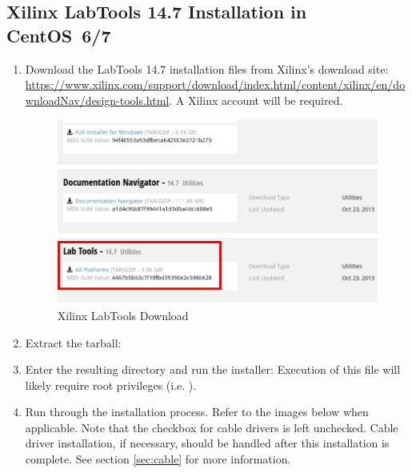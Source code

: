 \begin{flushleft}
\subsection{Xilinx LabTools 14.7 Installation in CentOS~6/7}
\label{sec:labtools}
\begin{flushleft}
\begin{enumerate}
\item Download the LabTools 14.7 installation files from Xilinx's download site:
\url{https://www.xilinx.com/support/download/index.html/content/xilinx/en/downloadNav/design-tools.html}. A Xilinx account will be required.
\begin{figure}[H]
	\centerline{\includegraphics[scale=0.4]{figures/xilinx_labtools_download}}
	\caption{Xilinx LabTools Download}
\end{figure}
\item Extract the tarball:\newline
{}
\item Enter the resulting directory and run the installer:\newline
{}\newline
{}\newline
Execution of this file will likely require root privileges (i.e. ).
\pagebreak
\item Run through the installation process. Refer to the images below when applicable. Note that the checkbox for cable drivers is left unchecked. Cable driver installation, if necessary, should be handled after this installation is complete. See section \ref{sec:cable} for more information.
\begin{figure}[H]

\end{figure}
\end{enumerate}
\end{flushleft}
\end{flushleft}

